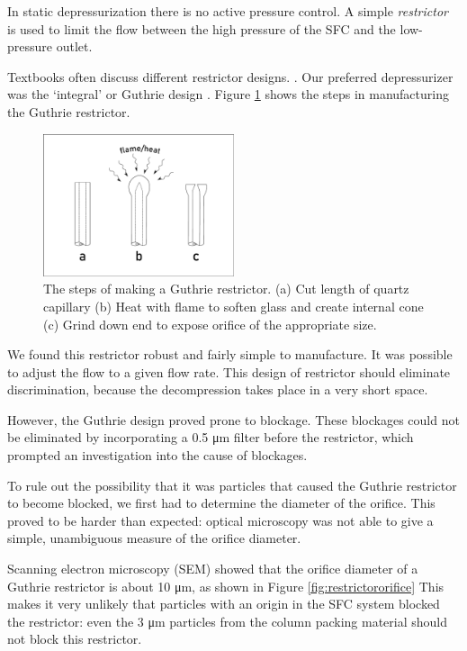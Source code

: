 In static depressurization there is no active pressure control. A simple
\textit{restrictor} is used to limit the flow between the high pressure of the
SFC and the low-pressure outlet. 

Textbooks often discuss different restrictor designs.
\autocite[The book by][provides an example.]{LuquedeCastro1994}. Our preferred
depressurizer was the `integral' or Guthrie design \autocite{Guthrie1986}.
Figure \ref{fig:restrictor} shows the steps in manufacturing the Guthrie
restrictor.

\begin{figure}
\centering
\includegraphics[width=0.5\textwidth]{Figures/Restrictor.pdf}
\decoRule

\caption[A diagram of a integral restrictor.]{The steps of making a Guthrie restrictor. (a) Cut
length of quartz capillary (b) Heat with flame to soften glass and create
internal cone (c) Grind down end to expose orifice of the appropriate size.}

\label{fig:restrictor}
\end{figure}

We found this restrictor robust and fairly simple to manufacture. It was
possible to adjust the flow to a given flow rate. This design of restrictor
should eliminate discrimination, because the decompression takes place in a very
short space.

However, the Guthrie design proved prone to blockage. These blockages could not
be eliminated by incorporating a 0.5 \si{\micro\metre} filter before the restrictor, which
prompted an investigation into the cause of blockages.

To rule out the possibility that it was particles that caused the Guthrie
restrictor to become blocked, we first had to determine the diameter of the
orifice. This proved to be harder than expected: optical microscopy was not able
to give a simple, unambiguous measure of the orifice diameter.

Scanning electron microscopy (SEM) showed that the orifice diameter of a Guthrie
restrictor is about 10 \si{\micro\meter}, as shown in Figure
\ref{fig:restrictororifice} This makes it very unlikely that particles with an
origin in the SFC system blocked the restrictor: even the 3 \si{\micro\meter}
particles from the column packing material should not block this restrictor.


